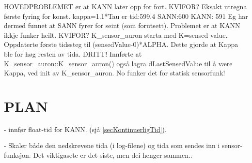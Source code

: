 	HOVEDPROBLEMET er at KANN later opp for fort. KVIFOR? Eksakt utregna første fyring for konst. kappa=1.1*Tau er tid:599.4  
	SANN:600 	KANN: 591
	Eg har dermed funnet at SANN fyrer for seint (som forutsett). Problemet er at KANN ikkje funker heilt. KVIFOR?
	K_sensor_auron starta med K=sensed value. Oppdaterte første tidssteg til (sensedValue-0)*ALPHA. Dette gjorde at Kappa ble for høg resten av tida. DRITT!
	Innførte at K_sensor_auron::K_sensor_auron() også lagra dLastSensedValue til å være Kappa, ved init av K_sensor_auron. No funker det for statisk sensorfunk!

\section{PLAN}
	- innfør float-tid for KANN. (sjå \ref{secKontinuerligTid}).

	- Skaler både den nedskrevene tida (i log-filene) og tida som sendes inn i sensor-funksjon. Det viktigasete er det siste, men dei henger sammen..
